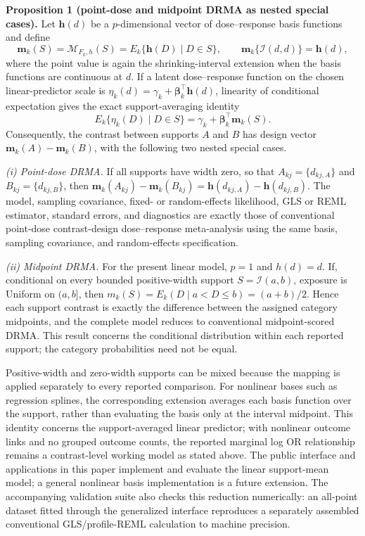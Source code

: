 \documentclass[journal=rsm]{CUP-JNL-DTM}%
\theoremstyle{definition}
\numberwithin{equation}{section}
\begin{document}
\noindent\textbf{Proposition 1 (point-dose and midpoint DRMA as nested special cases).}
Let $\mathbf h(d)$ be a $p$-dimensional vector of
dose--response basis functions and define
\begin{equation}
  \mathbf m_k(S)=\mathcal M_{F_k,h}(S)
  =E_k\{\mathbf h(D)\mid D\in S\},
  \qquad
  \mathbf m_k\{\mathcal I(d,d)\}=\mathbf h(d),
  \label{eq:support_basis}
\end{equation}
where the point value is again the shrinking-interval extension when the basis
functions are continuous at $d$. If a latent dose--response function on the
chosen linear-predictor scale is
$\eta_k(d)=\gamma_k+\boldsymbol\beta_k^\top\mathbf h(d)$, linearity of
conditional expectation gives the exact support-averaging identity
\begin{equation}
 E_k\{\eta_k(D)\mid D\in S\}
 =\gamma_k+\boldsymbol\beta_k^\top\mathbf m_k(S).
 \label{eq:support_identity}
\end{equation}
Consequently, the contrast between supports $A$ and $B$ has design vector
$\mathbf m_k(A)-\mathbf m_k(B)$, with the following two nested special cases.

\emph{(i) Point-dose DRMA.} If all supports have width zero, so that
$A_{kj}=\{d_{kj,A}\}$ and $B_{kj}=\{d_{kj,B}\}$, then
$\mathbf m_k(A_{kj})-\mathbf m_k(B_{kj})=
\mathbf h(d_{kj,A})-\mathbf h(d_{kj,B})$. The model, sampling covariance,
fixed- or random-effects likelihood, GLS or REML estimator, standard errors,
and diagnostics are exactly those of conventional point-dose contrast-design
dose--response meta-analysis using the same basis, sampling covariance, and
random-effects specification.

\emph{(ii) Midpoint DRMA.} For the present linear model, $p=1$ and $h(d)=d$.
If, conditional on every bounded positive-width support
$S=\mathcal I(a,b)$, exposure is Uniform on $(a,b]$, then
$m_k(S)=E_k(D\mid a<D\leq b)=(a+b)/2$. Hence each support contrast is exactly
the difference between the assigned category midpoints, and the complete
model reduces to conventional midpoint-scored DRMA. This result concerns the
conditional distribution within each reported support; the category
probabilities need not be equal.

Positive-width and zero-width supports can be mixed because the
mapping is applied separately to every reported comparison. For nonlinear
bases such as regression splines, the corresponding extension averages each
basis function over the support, rather than evaluating the basis only at the
interval midpoint. This identity concerns the support-averaged linear
predictor; with nonlinear outcome links and no grouped outcome counts, the
reported marginal log OR relationship remains a contrast-level working
model as stated above. The public interface and applications in this paper
implement and evaluate the linear support-mean model; a general nonlinear
basis implementation is a future extension.
The accompanying validation suite also checks this reduction numerically: an
all-point dataset fitted through the generalized interface reproduces a
separately assembled conventional GLS/profile-REML calculation to machine
precision.
\end{document}
